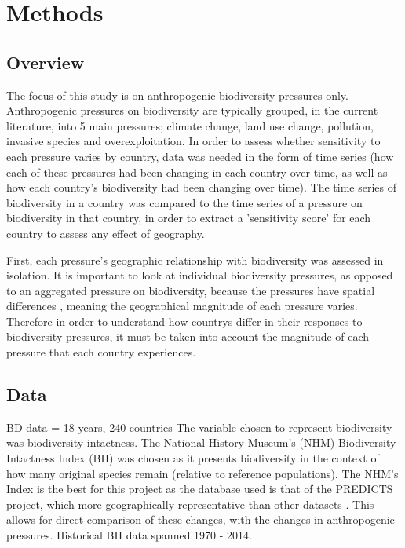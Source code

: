 \documentclass[11pt, a4paper, titlepage]{article}
\begin{document}
    \section*{Methods}

	\subsection*{Overview}

	The focus of this study is on anthropogenic biodiversity pressures only. Anthropogenic pressures on biodiversity are typically grouped, in the current literature, into 5 main pressures; climate change, land use change, pollution, invasive species and overexploitation. In order to assess whether sensitivity to each pressure varies by country, data was needed in the form of time series (how each of these pressures had been changing in each country over time, as well as how each country's biodiversity had been changing over time). The time series of biodiversity in a country was compared to the time series of a pressure on biodiversity in that country, in order to extract a 'sensitivity score' for each country to assess any effect of geography. \newline
	
	First, each pressure's geographic relationship with biodiversity was assessed in isolation. It is important to look at individual biodiversity pressures, as opposed to an aggregated pressure on biodiversity, because the pressures have spatial differences \citep{steffen2015planetary}, meaning the geographical magnitude of each pressure varies. Therefore in order to understand how countrys differ in their responses to biodiversity pressures, it must be taken into account the magnitude of each pressure that each country experiences. \newline
	\subsection*{Data}
	
	BD data = 18 years, 240 countries
	The variable chosen to represent biodiversity was biodiversity intactness. The National History Museum's (NHM) Biodiversity Intactness Index (BII)\citep{Heather2021} was chosen as it presents biodiversity in the context of how many original species remain (relative to reference populations). The NHM's Index is the best for this project as the database used is that of the PREDICTS project, which more geographically representative than other datasets \citep{purvis2018modelling}. This allows for direct comparison of these changes, with the changes in anthropogenic pressures. Historical BII data spanned 1970 - 2014. \newline
	
\end{document}
